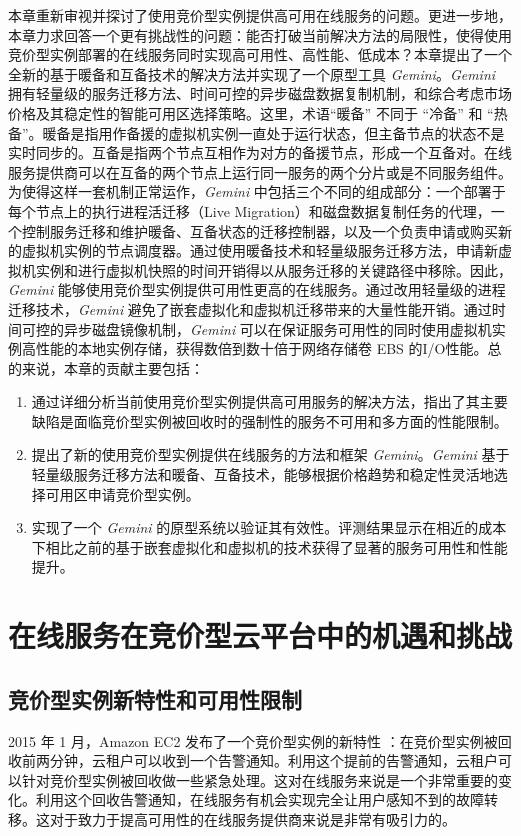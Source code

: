 本章重新审视并探讨了使用竞价型实例提供高可用在线服务的问题。更进一步地，本章力求回答一个更有挑战性的问题：能否打破当前解决方法的局限性，使得使用竞价型实例部署的在线服务同时实现高可用性、高性能、低成本？本章提出了一个全新的基于暖备和互备技术的解决方法并实现了一个原型工具 \emph{Gemini}。\emph{Gemini} 拥有轻量级的服务迁移方法、时间可控的异步磁盘数据复制机制，和综合考虑市场价格及其稳定性的智能可用区选择策略。这里，术语``暖备'' 不同于 ``冷备'' 和 ``热备''。暖备是指用作备援的虚拟机实例一直处于运行状态，但主备节点的状态不是实时同步的。互备是指两个节点互相作为对方的备援节点，形成一个互备对。在线服务提供商可以在互备的两个节点上运行同一服务的两个分片或是不同服务组件。为使得这样一套机制正常运作，\emph{Gemini} 中包括三个不同的组成部分：一个部署于每个节点上的执行进程活迁移（Live Migration）和磁盘数据复制任务的代理，一个控制服务迁移和维护暖备、互备状态的迁移控制器，以及一个负责申请或购买新的虚拟机实例的节点调度器。通过使用暖备技术和轻量级服务迁移方法，申请新虚拟机实例和进行虚拟机快照的时间开销得以从服务迁移的关键路径中移除。因此，\emph{Gemini} 能够使用竞价型实例提供可用性更高的在线服务。通过改用轻量级的进程迁移技术，\emph{Gemini} 避免了嵌套虚拟化和虚拟机迁移带来的大量性能开销。通过时间可控的异步磁盘镜像机制，\emph{Gemini} 可以在保证服务可用性的同时使用虚拟机实例高性能的本地实例存储，获得数倍到数十倍于网络存储卷 EBS 的I/O性能。总的来说，本章的贡献主要包括：
\begin{enumerate}
\item 通过详细分析当前使用竞价型实例提供高可用服务的解决方法，指出了其主要缺陷是面临竞价型实例被回收时的强制性的服务不可用和多方面的性能限制。
\item 提出了新的使用竞价型实例提供在线服务的方法和框架 \emph{Gemini}。\emph{Gemini} 基于轻量级服务迁移方法和暖备、互备技术，能够根据价格趋势和稳定性灵活地选择可用区申请竞价型实例。
\item 实现了一个 \emph{Gemini} 的原型系统以验证其有效性。评测结果显示在相近的成本下相比之前的基于嵌套虚拟化和虚拟机的技术获得了显著的服务可用性和性能提升。
\end{enumerate}

\section{在线服务在竞价型云平台中的机遇和挑战}
\subsection{竞价型实例新特性和可用性限制}
2015 年 1 月，Amazon EC2 发布了一个竞价型实例的新特性 \cite{AWS_SITN:2016}：在竞价型实例被回收前两分钟，云租户可以收到一个告警通知。利用这个提前的告警通知，云租户可以针对竞价型实例被回收做一些紧急处理。这对在线服务来说是一个非常重要的变化。利用这个回收告警通知，在线服务有机会实现完全让用户感知不到的故障转移。这对于致力于提高可用性的在线服务提供商来说是非常有吸引力的。

